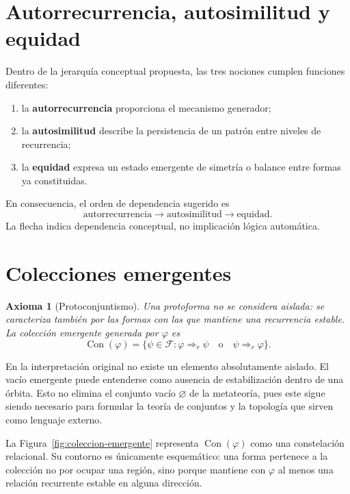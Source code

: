 \documentclass[11pt]{article}
\numberwithin{equation}{section}
\theoremstyle{prism}
\newtheorem{axioma}{Axioma}
\newcommand{\F}{\mathcal{F}}
\newcommand{\pentails}{\Rightarrow_{\!r}}
\DeclareMathOperator{\Con}{Con}
\begin{document}
\FloatBarrier
\section{Autorrecurrencia, autosimilitud y equidad}

Dentro de la jerarquía conceptual propuesta, las tres nociones cumplen
funciones diferentes:
\begin{enumerate}
  \item la \textbf{autorrecurrencia} proporciona el mecanismo generador;
  \item la \textbf{autosimilitud} describe la persistencia de un patrón entre
  niveles de recurrencia;
  \item la \textbf{equidad} expresa un estado emergente de simetría o balance
  entre formas ya constituidas.
\end{enumerate}
En consecuencia, el orden de dependencia sugerido es
\[
  \boxed{\text{autorrecurrencia}}
  \longrightarrow
  \boxed{\text{autosimilitud}}
  \longrightarrow
  \boxed{\text{equidad}}.
\]
La flecha indica dependencia conceptual, no implicación lógica automática.

\section{Colecciones emergentes}

\begin{axioma}[Protoconjuntismo]
Una protoforma no se considera aislada: se caracteriza también por las formas
con las que mantiene una recurrencia estable. La colección emergente generada
por $\varphi$ es
\begin{equation}
  \Con(\varphi)
  =\bigl\{\psi\in\F:
  \varphi\pentails\psi\quad\text{o}\quad\psi\pentails\varphi\bigr\}.
  \label{eq:conjunto}
\end{equation}
\end{axioma}

En la interpretación original no existe un elemento absolutamente aislado. El
vacío emergente puede entenderse como ausencia de estabilización dentro de una
órbita. Esto no elimina el conjunto vacío $\varnothing$ de la metateoría, pues
este sigue siendo necesario para formular la teoría de conjuntos y la topología
que sirven como lenguaje externo.

La Figura~\ref{fig:coleccion-emergente} representa $\Con(\varphi)$ como una
constelación relacional. Su contorno es únicamente esquemático: una forma
pertenece a la colección no por ocupar una región, sino porque mantiene con
$\varphi$ al menos una relación recurrente estable en alguna dirección.
\end{document}
